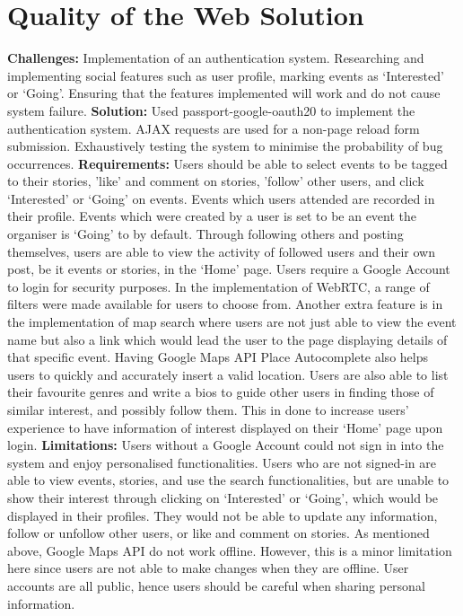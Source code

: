\documentclass[11pt, a4paper]{article}
\begin{document}
\section{Quality of the Web Solution}
\textbf{Challenges:} Implementation of an authentication system. Researching and implementing social
features such as user profile, marking events as `Interested' or `Going'. Ensuring that the features
implemented will work and do not cause system failure. \textbf{Solution:} Used
passport-google-oauth20 \cite{passport_google} to implement the authentication system. AJAX
requests are used for a non-page reload form submission. Exhaustively testing the system to
minimise the probability of bug occurrences. \textbf{Requirements:} Users should be able to select
events to be tagged to their stories, 'like' and comment on stories, 'follow' other users, and click
`Interested' or `Going' on events. Events which users attended are recorded in their profile. Events
which were created by a user is set to be an event the organiser is `Going' to by default. Through
following others and posting themselves, users are able to view the activity of followed users and
their own post, be it events or stories, in the `Home' page. Users require a Google Account to login
for security purposes. In the implementation of WebRTC, a range of filters were made available for
users to choose from. Another extra feature is in the implementation of map search where users are
not just able to view the event name but also a link which would lead the user to the page
displaying details of that specific event. Having Google Maps API Place Autocomplete also helps
users to quickly and accurately insert a valid location. Users are also able to list their favourite
genres and write a bios to guide other users in finding those of similar interest, and possibly
follow them. This in done to increase users' experience to have information of interest displayed
on their `Home' page upon login. \textbf{Limitations:} Users without a Google Account could not
sign in into the system and enjoy personalised functionalities. Users who are not signed-in are
able to view events, stories, and use the search functionalities, but are unable to show their
interest through clicking on `Interested' or `Going', which would be displayed in their profiles.
They would not be able to update any information, follow or unfollow other users, or like and
comment on stories. As mentioned above, Google Maps API do not work offline. However, this is a
minor limitation here since users are not able to make changes when they are offline. User accounts
are all public, hence users should be careful when sharing personal information.
\end{document}
